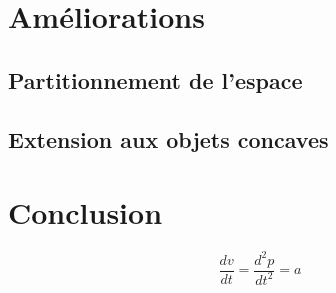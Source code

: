 \documentclass[twocolumn]{article}
\begin{document}
\section{Améliorations}

\subsection{Partitionnement de l'espace}

\subsection{Extension aux objets concaves}

\section{Conclusion}

\begin{equation}
  \frac{dv}{dt} = \frac{d^2p}{dt^2} = a 
\end{equation}



\end{document}
